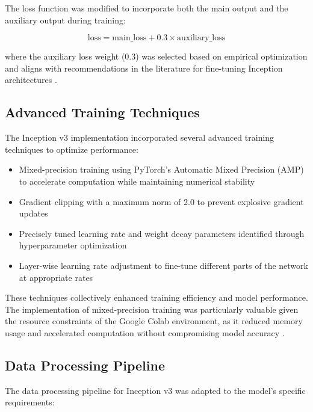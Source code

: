 \documentclass[a4paper,12pt]{article}
\begin{document}
The loss function was modified to incorporate both the main output and the auxiliary output during training:

\begin{equation}
\text{loss} = \text{main\_loss} + 0.3 \times \text{auxiliary\_loss}
\end{equation}

where the auxiliary loss weight (0.3) was selected based on empirical optimization and aligns with recommendations in the literature for fine-tuning Inception architectures \citep{touvron2021training}.

\subsection{Advanced Training Techniques}

The Inception v3 implementation incorporated several advanced training techniques to optimize performance:

\begin{itemize}
    \item Mixed-precision training using PyTorch's Automatic Mixed Precision (AMP) to accelerate computation while maintaining numerical stability \citep{micikevicius2018mixed}
    \item Gradient clipping with a maximum norm of 2.0 to prevent explosive gradient updates \citep{you2019large}
    \item Precisely tuned learning rate and weight decay parameters identified through hyperparameter optimization
    \item Layer-wise learning rate adjustment to fine-tune different parts of the network at appropriate rates
\end{itemize}

These techniques collectively enhanced training efficiency and model performance. The implementation of mixed-precision training was particularly valuable given the resource constraints of the Google Colab environment, as it reduced memory usage and accelerated computation without compromising model accuracy \citep{ghani2024comprehensive}.

\subsection{Data Processing Pipeline}

The data processing pipeline for Inception v3 was adapted to the model's specific requirements:
\end{document}
